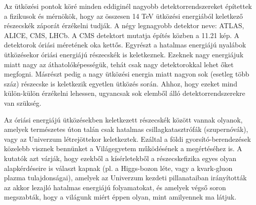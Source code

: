\documentclass[../main.tex]{subfiles}
\begin{document}
Az ütközési pontok köré minden eddiginél nagyobb detektorrendszereket építettek a
fizikusok és mérnökök, hogy az összesen 14 TeV ütközési energiából keletkező részecskék
záporát érzékelni tudják. A négy legnagyobb detektor neve: ATLAS, ALICE, CMS,
LHCb. A CMS detektort mutatja építés közben a 11.21 kép. A detektorok óriási méretének oka kettős. Egyrészt a hatalmas energiájú nyalábok ütközésekor óriási energiájú
részecskék is keletkeznek. Ezeknek nagy energiájuk miatt nagy az áthatolóképességük,
tehát csak nagy detektorokkal lehet őket megfogni. Másrészt pedig a nagy ütközési energia miatt nagyon sok (esetleg több száz) részecske is keletkezik egyetlen ütközés során.
Ahhoz, hogy ezeket mind külön-külön érzékelni lehessen, ugyancsak sok elemből álló
detektorrendszerekre van szükség.

Az óriási energiájú ütközésekben keletkezett részecskék között vannak olyanok, amelyek természetes úton talán csak hatalmas csillagkatasztrófák (szupernóvák), vagy az
Univerzum létrejöttekor keletkeztek. Ezáltal a földi gyorsító-berendezések közelebb visznek bennünket a Világegyetem működésének a megértéséhez is.
A kutatók azt várják, hogy ezekből a kísérletekből a részecskefizika egyes olyan alapkérdéseire is választ kapnak (pl. a Higgs-bozon léte, vagy a kvark-gluon plazma tulajdonságai),
amelyek az Univerzum kezdeti pillanataiban irányították az akkor lezajló hatalmas energiájú folyamatokat, és amelyek végső soron megszabták, hogy a világunk
miért éppen olyan, mint amilyennek ma látjuk.
\end{document}
